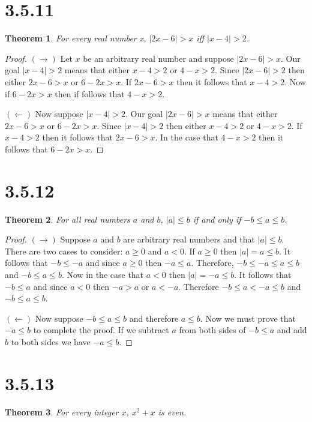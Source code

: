 \documentclass{article}
\newtheorem*{theorem}{Theorem}  %
\begin{document}
\section*{3.5.11}
\begin{theorem} For every real number x, $|2x - 6| > x$ iff $|x - 4| > 2$.
\end{theorem}

\begin{proof}
$(\rightarrow)$ Let $x$ be an arbitrary real number and suppose $| 2x - 6 | > x $. Our goal $| x - 4 | > 2$ means that either $x - 4 > 2$ or $4 - x > 2$. Since $ | 2x - 6 | > 2 $ then either $2x - 6 > x$ or $6 - 2x > x$. If $2x - 6 > x$ then it follows that $x - 4 > 2$. Now if $6 - 2x > x$ then if follows that $4 - x >2$. 

$(\leftarrow)$ Now suppose $| x - 4 | > 2$. Our goal $| 2x - 6 | > x$ means that either $2x - 6 > x$ or $6 - 2x > x$. Since $| x - 4 | > 2$ then either $x - 4 > 2$ or $4 - x > 2$. If $x - 4 > 2$ then it follows that $2x - 6 > x$. In the case that $4 - x > 2$ then it follows that $6 - 2x > x$.
\end{proof}

\section*{3.5.12}
\begin{theorem} For all real numbers $a$ and $b$, $| a | \leq b$ if and only if $-b \leq a \leq b$.
\end{theorem}

\begin{proof}
$(\rightarrow)$ Suppose $a$ and $b$ are arbitrary real numbers and that $| a | \leq b$. There are two cases to consider: $a \geq 0$ and $a < 0$. If $a \geq 0$ then $| a | = a \leq b$. It follows that $-b \leq -a$ and since $a \geq 0$ then $-a \leq a$. Therefore, $-b \leq -a \leq a \leq b$ and $-b \leq a \leq b$. Now in the case that $a < 0$ then $| a | = -a \leq b$. It follows that $-b \leq a$ and since $a < 0$ then $-a > a$ or $a < -a$. Therefore $-b \leq a < -a \leq b$ and $-b \leq a \leq b$.

$(\leftarrow)$ Now suppose $-b \leq a \leq b$ and therefore $a \leq b$. Now we must prove that $-a \leq b$ to complete the proof. If we subtract $a$ from both sides of $-b \leq a$ and add $b$ to both sides we have $-a \leq b$. 
\end{proof}

\section*{3.5.13}
\begin{theorem} For every integer $x$, $x^2 + x$ is even.
\end{theorem}
\end{document}
